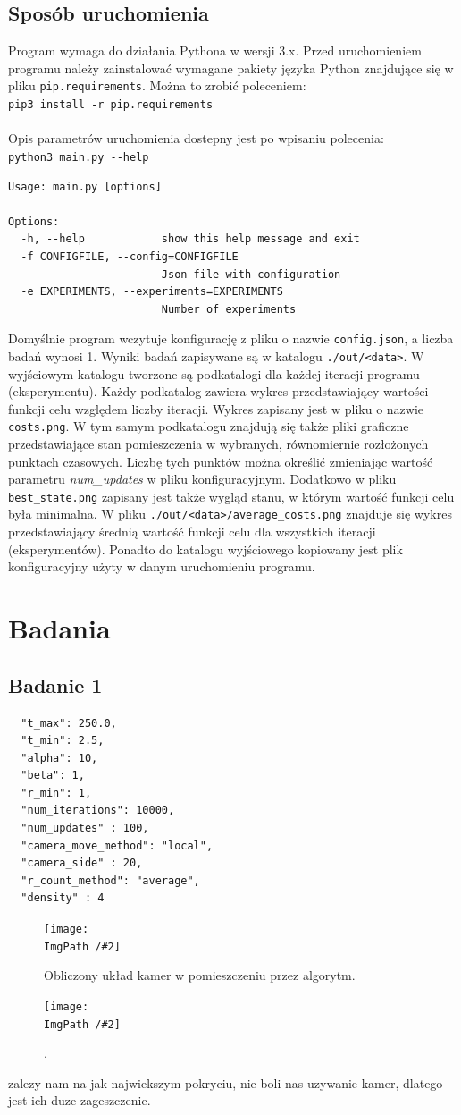 \documentclass[12pt,a4paper]{article}
\newcommand{\ImgPath}{./img/}
\newcommand\Figure[4][width=\linewidth]{%
  \begin{figure} [h!]
    \centering
    \texttt{[image: \\ImgPath /\#2]}
    \caption{#3}\label{#4}
  \end{figure}
}
\begin{document}
\subsection{Sposób uruchomienia}
Program wymaga do działania Pythona w wersji 3.x.
Przed uruchomieniem programu należy zainstalować wymagane pakiety języka Python
znajdujące się w pliku \texttt{pip.requirements}. Można to zrobić poleceniem:\\
\texttt{pip3 install -r pip.requirements}\\\\
Opis parametrów uruchomienia dostepny jest po wpisaniu polecenia:\\
\texttt{python3 main.py -{}-help}
\begin{verbatim}
Usage: main.py [options]

Options:
  -h, --help            show this help message and exit
  -f CONFIGFILE, --config=CONFIGFILE
                        Json file with configuration
  -e EXPERIMENTS, --experiments=EXPERIMENTS
                        Number of experiments
\end{verbatim}
Domyślnie program wczytuje konfigurację z pliku o nazwie \texttt{config.json},
a liczba badań wynosi 1. Wyniki badań zapisywane są w katalogu
\texttt{./out/<data>}. W wyjściowym katalogu tworzone są podkatalogi dla
każdej iteracji programu (eksperymentu). Każdy podkatalog zawiera wykres
przedstawiający wartości funkcji celu względem liczby iteracji. Wykres zapisany
jest w pliku o nazwie \texttt{costs.png}. W tym samym podkatalogu znajdują
się także pliki graficzne przedstawiające stan pomieszczenia w wybranych,
równomiernie rozłożonych punktach czasowych. Liczbę tych punktów można
określić zmieniając wartość parametru \emph{num\_updates} w pliku konfiguracyjnym.
Dodatkowo w pliku \texttt{best\_state.png} zapisany jest także wygląd stanu,
w którym wartość funkcji celu była minimalna.
W pliku \texttt{./out/<data>/average\_costs.png} znajduje się wykres przedstawiający
średnią wartość funkcji celu dla wszystkich iteracji (eksperymentów).
Ponadto do katalogu wyjściowego kopiowany jest plik konfiguracyjny użyty w danym
uruchomieniu programu.


\section{Badania}
\subsection{Badanie 1}
\begin{lstlisting}
  "t_max": 250.0,
  "t_min": 2.5,
  "alpha": 10,
  "beta": 1,
  "r_min": 1,
  "num_iterations": 10000,
  "num_updates" : 100,
  "camera_move_method": "local",
  "camera_side" : 20,
  "r_count_method": "average",
  "density" : 4
\end{lstlisting}
\Figure[scale=0.4]{1/best_state.png}{Obliczony układ kamer w pomieszczeniu przez algorytm.}{label}
\Figure[scale=0.4]{1/average_costs.png}{.}{label}
zalezy nam na jak najwiekszym pokryciu, nie boli nas uzywanie kamer, dlatego jest ich duze zageszczenie.
\end{document}
